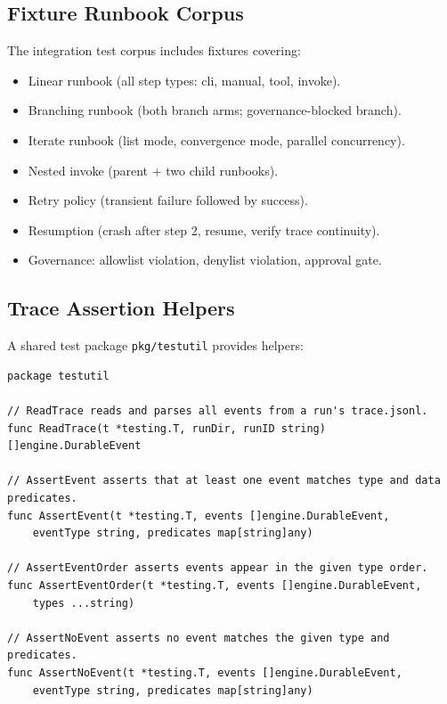 \subsection{Fixture Runbook Corpus}

The integration test corpus includes fixtures covering:

\begin{itemize}
  \item Linear runbook (all step types: cli, manual, tool, invoke).
  \item Branching runbook (both branch arms; governance-blocked branch).
  \item Iterate runbook (list mode, convergence mode, parallel concurrency).
  \item Nested invoke (parent + two child runbooks).
  \item Retry policy (transient failure followed by success).
  \item Resumption (crash after step 2, resume, verify trace continuity).
  \item Governance: allowlist violation, denylist violation, approval gate.
\end{itemize}

\subsection{Trace Assertion Helpers}

A shared test package \texttt{pkg/testutil} provides helpers:

\begin{verbatim}
package testutil

// ReadTrace reads and parses all events from a run's trace.jsonl.
func ReadTrace(t *testing.T, runDir, runID string) []engine.DurableEvent

// AssertEvent asserts that at least one event matches type and data predicates.
func AssertEvent(t *testing.T, events []engine.DurableEvent,
    eventType string, predicates map[string]any)

// AssertEventOrder asserts events appear in the given type order.
func AssertEventOrder(t *testing.T, events []engine.DurableEvent,
    types ...string)

// AssertNoEvent asserts no event matches the given type and predicates.
func AssertNoEvent(t *testing.T, events []engine.DurableEvent,
    eventType string, predicates map[string]any)
\end{verbatim}

